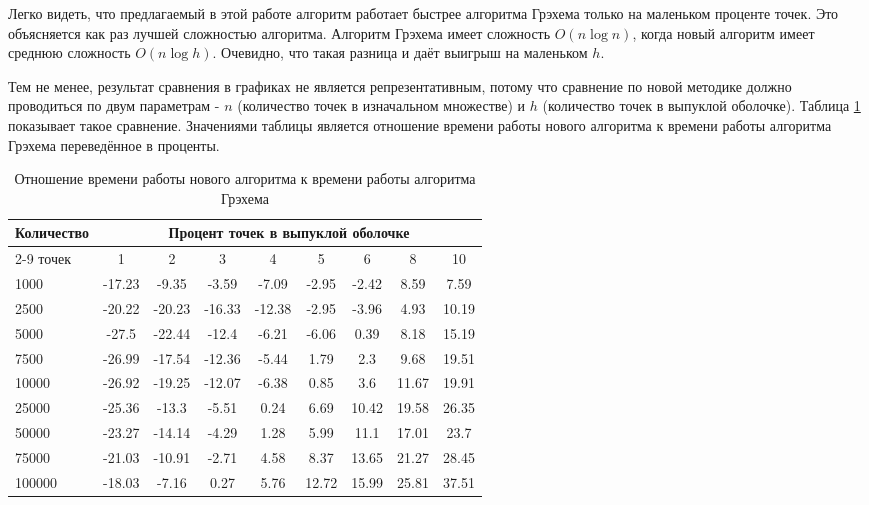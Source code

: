 Легко видеть, что предлагаемый в этой работе алгоритм работает быстрее алгоритма Грэхема только на маленьком проценте точек. Это объясняется как раз лучшей сложностью алгоритма. Алгоритм Грэхема имеет сложность $O(n \log n)$, когда новый алгоритм имеет среднюю сложность $O(n \log h)$. Очевидно, что такая разница и даёт выигрыш на маленьком $h$.

Тем не менее, результат сравнения в графиках не является репрезентативным, потому что сравнение по новой методике должно проводиться по двум параметрам - $n$ (количество точек в изначальном множестве) и $h$ (количество точек в выпуклой оболочке). Таблица \ref{table:ratio} показывает такое сравнение. Значениями таблицы является отношение времени работы нового алгоритма к времени работы алгоритма Грэхема переведённое в проценты.


\begin{table}[H]
	\centering
	\caption{Отношение времени работы нового алгоритма к времени работы алгоритма Грэхема}
	\label{table:ratio}
	\begin{tabular}{|l|c|c|c|c|c|c|c|c|}
\hline
\multirow{2}{*}{Количество} & \multicolumn{8}{c|}{Процент точек в выпуклой оболочке} \\ \cline{2-9}
точек& 1 & 2 & 3 & 4 & 5 & 6 & 8 & 10 \\ \hline
1000  &  -17.23 & -9.35  & -3.59  & -7.09  & -2.95 & -2.42 &  8.59 & 7.59  \\ \hline
2500  &  -20.22 & -20.23 & -16.33 & -12.38 & -2.95 & -3.96 &  4.93 & 10.19 \\ \hline
5000  &  -27.5  & -22.44 & -12.4  & -6.21  & -6.06 &  0.39 &  8.18 & 15.19 \\ \hline
7500  &  -26.99 & -17.54 & -12.36 & -5.44  &  1.79 &  2.3  &  9.68 & 19.51 \\ \hline
10000 &  -26.92 & -19.25 & -12.07 & -6.38  &  0.85 &  3.6  & 11.67 & 19.91 \\ \hline
25000 &  -25.36 & -13.3  & -5.51  &  0.24  &  6.69 & 10.42 & 19.58 & 26.35 \\ \hline
50000 &  -23.27 & -14.14 & -4.29  &  1.28  &  5.99 & 11.1  & 17.01 & 23.7  \\ \hline
75000 &  -21.03 & -10.91 & -2.71  &  4.58  &  8.37 & 13.65 & 21.27 & 28.45 \\ \hline
100000&  -18.03 & -7.16  &  0.27  &  5.76  & 12.72 & 15.99 & 25.81 & 37.51 \\ \hline
	\end{tabular}
\end{table}


